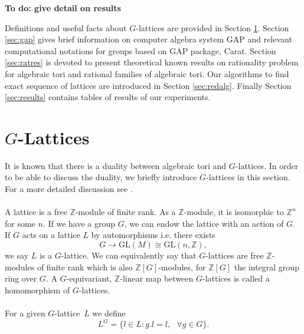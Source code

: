 \documentclass[12pt]{article}
\theoremstyle{plain}
\theoremstyle{definition}
\newcommand{\Z}{\ensuremath{\mathbb{Z}}}
\newcommand{\G}{G}
\newcommand{\glat}{$G$-lattice}
\newcommand{\todo}[1]{{\bf {\color{red}To do: #1}} }
\begin{document}
\todo{give detail on results}

Definitions and useful facts about $G$-lattices are provided in Section \ref{sec:g-lattices}. Section 
\ref{sec:gap} gives brief information on computer algebra system GAP and relevant computational 
notations for groups based on GAP package, Carat. Section \ref{sec:ratres} is devoted to present 
theoretical known results on rationality problem for algebraic tori and rational families of algebraic 
tori. Our algorithms to find exact sequence of lattices are introduced in Section \ref{sec:redalg}. Finally Section \ref{sec:results} contains tables of results of our experiments.
 

\section{$G$-Lattices}\label{sec:g-lattices}
It is known that there is a duality between algebraic tori and \glat s. In order to be able to discuss the duality, we briefly introduce \glat s in this section. For a more detailed discussion see \cite[Chapters 1 and 2]{Lorenz}.\\ \\
A lattice is a free $\mathbb{Z}$-module of finite rank. As a $\Z$-module, it is isomorphic to $\mathbb{Z}^n$ for some $n$. If we have a group $G$, we can endow the lattice with an action of $G$. If $G$ acts on a lattice $L$ by automorphisms i.e. there exists $$ G \longrightarrow \mathrm{GL}(M) \cong \mathrm{GL}(n,\mathbb{Z}),$$ 
we say $L$ is a $G$-lattice. We can equivalently say that $\G$-lattices are free $\Z$-modules of finite rank which is also $\mathbb{Z}[G]$-modules, for $\mathbb{Z}[G]$ the integral group ring over $G$. A $G$-equivariant, $ \mathbb{Z}$-linear map between $G$-lattices is called a homomorphism of $G$-lattices.\\
\\For a given \glat \, $L$ we define $$ L^\G = \lbrace l \in L : g.l=l,  \,\, \,\,  \forall g \in \G \rbrace. $$
\end{document}
